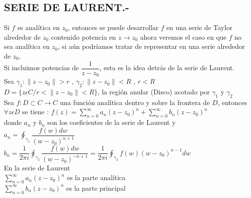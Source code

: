\documentclass[10pt,a4paper]{article}
\begin{document}
\subsection{SERIE DE LAURENT.-}
Si $f$ es analítica en $z_0$, entonces se puede desarrollar $f$ en una serie de Taylor alrededor de $z_0$ contenido potencia en $\displaystyle{z \rightarrow z_0}$ ahora veremos el caso en que $f$ no sea analítica en $z_0$, si aún podríamos tratar de representar en una serie alrededor de $z_0$. \\
Si incluimos potencias de $\displaystyle{\dfrac{1}{z-z_0}}$, esta es la idea detrás de la serie de Laurent. \\
Sea $\displaystyle{\gamma_1 : \parallel z - z_0 \parallel > r}$ , $\displaystyle{\gamma_2 : \parallel z - z_0 \parallel < R}$ , $r < R$\\
$\displaystyle{D = \lbrace z \epsilon C / r < \parallel    z - z_0 \parallel < R \rbrace}$, la región anular (Disco) acotado por $\gamma_1$ y $\gamma_2$\\
Sea $\displaystyle{f: D \subset C \longrightarrow C}$ una función analítica dentro y sobre la frontera de $D$, entonces $\forall z \epsilon D$ se tiene : $\displaystyle{f(z) = \sum_{n = 0}^{\infty} a_n (z-z_0)^n + \sum_{n = 0}^{\infty} b_n (z-z_0)^n}$\\
donde $a_n$ y $b_n$ son los coeficientes de la serie de Laurent y $\displaystyle{a_n = \oint_{\gamma_1} \dfrac{f(w) dw}{(w-z_0)^{n+1}}}$ 
$\displaystyle{b_n = \dfrac{1}{2 \pi i} \oint_{\gamma_2} \dfrac{f(w) dw}{(w-z_0)^{-n+1}} = \dfrac{1}{2 \pi i} \oint_{\gamma_2} f(w) (w-z_0)^{n-1} dw}$ \\
En la serie de Laurent \\
$\displaystyle{\sum_{n = 0}^{\infty} a_n (z-z_0)^n}$ es la parte analítica \\
$\displaystyle{\sum_{n = 0}^{\infty} b_n (z-z_0)^n}$ es la parte principal \\
\end{document}
